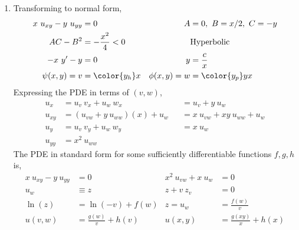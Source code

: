 \begin{enumerate}
    \item Transforming to normal form,
          \begin{align}
              x\ u_{xy} - y\ u_{yy} & = 0                    &
              A                     & = 0,\ B = x/2,\ C = -y   \\
              AC - B^2              & = -\frac{x^2}{4} < 0   &
                                    & \text{Hyperbolic}        \\
              -x\ y' - y            & = 0                    &
              y                     & = \frac{c}{x}            \\
              \psi(x, y) = v        & = \color{y_h} x        &
              \phi(x, y) = w        & = \color{y_p} yx
          \end{align}
          Expressing the PDE in terms of $ (v, w) $,
          \begin{align}
              u_{x}  & = u_v\ v_x + u_w\ w_x           &
                     & = u_v + y\ u_w                    \\
              u_{xy} & = (u_{vw} + y\ u_{ww})(x) + u_w &
                     & = x\ u_{vw} + xy\ u_{ww} + u_w    \\
              u_{y}  & = u_v\ v_y + u_w\ w_y           &
                     & = x\ u_w                          \\
              u_{yy} & = x^2\ u_{ww}
          \end{align}
          The PDE in standard form for some sufficiently differentiable functions
          $ f, g, h $ is,
          \begin{align}
              x\ u_{xy} - y\ u_{yy} & = 0                      &
              x^2\ u_{vw} + x\ u_w  & = 0                        \\
              u_w                   & \equiv z                 &
              z + v\ z_v            & = 0                        \\
              \ln(z)                & = \ln(-v) + f(w)         &
              z = u_w               & = \frac{f(w)}{v}           \\
              u(v, w)               & = \frac{g(w)}{v} + h(v)  &
              u(x, y)               & = \frac{g(xy)}{x} + h(x)
          \end{align}


\end{enumerate}
